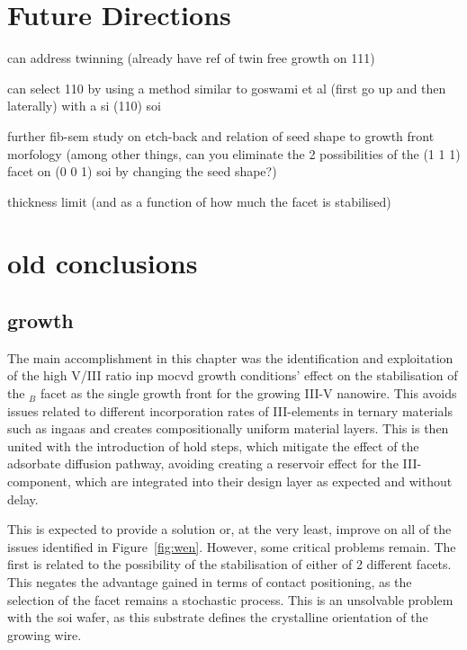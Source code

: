 \section{Future Directions}

can address twinning (already have ref of twin free growth on 111)

can select 110 by using a method similar to goswami et al (first go up and then laterally) with a si (110) soi

further fib-sem study on etch-back and relation of seed shape to growth front morfology (among other things, can you eliminate the 2 possibilities of the (1 1 1) facet on (0 0 1) soi by changing the seed shape?)

thickness limit (and as a function of how much the facet is stabilised)


\section{old conclusions}

\subsection{growth}

The main accomplishment in this chapter was the identification and exploitation of the high V/III ratio \acs{inp} \acs{mocvd} growth conditions' effect on the stabilisation of the \(_B\) facet as the single growth front for the growing III-V nanowire. This avoids issues related to different incorporation rates of III-elements in ternary materials such as \acs{ingaas} \cite{Borg2019} and creates compositionally uniform material layers. This is then united with the introduction of hold steps, which mitigate the effect of the adsorbate diffusion pathway, avoiding creating a reservoir effect for the III-component, which are integrated into their design layer as expected and without delay. 

This is expected to provide a solution or, at the very least, improve on all of the issues identified in Figure~\ref{fig:wen}. However, some critical problems remain. The first is related to the possibility of the stabilisation of either of 2 different  facets. This negates the advantage gained in terms of contact positioning, as the selection of the  facet remains a stochastic process. This is an unsolvable problem with the \hkl[0 0 1] \acs{soi} wafer, as this substrate defines the crystalline orientation of the growing wire. 

